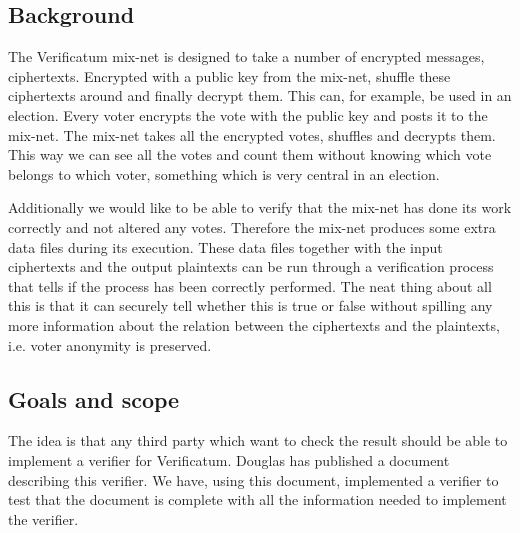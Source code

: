 \subsection{Background}

The Verificatum mix-net is designed to take a number of encrypted messages, ciphertexts. Encrypted with a public key from the mix-net, shuffle these ciphertexts around and finally decrypt them. This can, for example, be used in an election. Every voter encrypts the vote with the public key and posts it to the mix-net. The mix-net takes all the encrypted votes, shuffles and decrypts them. This way we can see all the votes and count them without knowing which vote belongs to which voter, something which is very central in an election.

Additionally we would like to be able to verify that the mix-net has done its work correctly and not altered any votes. Therefore the mix-net produces some extra data files during its execution. These data files together with the input ciphertexts and the output plaintexts can be run through a verification process that tells if the process has been correctly performed. The neat thing about all this is that it can securely tell whether this is true or false without spilling any more information about the relation between the ciphertexts and the plaintexts, i.e. voter anonymity is preserved.

\subsection{Goals and scope}

The idea is that any third party which want to check the result should be able to implement a verifier for Verificatum. Douglas has published a document describing this verifier. We have, using this document, implemented a verifier to test that the document is complete with all the information needed to implement the verifier.